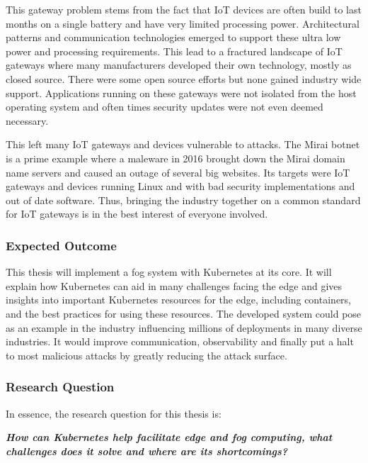 {This gateway problem stems from the fact that IoT devices are often build to last months on a single battery and have very limited processing power. Architectural patterns and communication technologies emerged to support these ultra low power and processing requirements. This lead to a fractured landscape of IoT gateways where many manufacturers developed their own technology, mostly as closed source. There were some open source efforts but none gained industry wide support. Applications running on these gateways were not isolated from the host operating system and often times security updates were not even deemed necessary.

This left many IoT gateways and devices vulnerable to attacks. The Mirai botnet\cite{7971869MiraiAndOtherBotnetLinux} is a prime example where a maleware in 2016 brought down the Mirai domain name servers and caused an outage of several big websites. Its targets were IoT gateways and devices running Linux and with bad security implementations and out of date software. Thus, bringing the industry together on a common standard for IoT gateways is in the best interest of everyone involved.
}

\subsubsection{Expected Outcome}
This thesis will implement a fog system with Kubernetes at its core. It will explain how Kubernetes can aid in many challenges facing the edge and gives insights into important Kubernetes resources for the edge, including containers, and the best practices for using these resources. The developed system could pose as an example in the industry influencing millions of deployments in many diverse industries. It would improve communication, observability and finally put a halt to most malicious attacks by greatly reducing the attack surface.

\subsubsection{Research Question}
In essence, the research question for this thesis is:
\begin{displayquote}\begin{center}
{\textit{\textbf{How can Kubernetes help facilitate edge and fog computing, what challenges does it solve and where are its shortcomings?}}}
\end{center}\end{displayquote}

